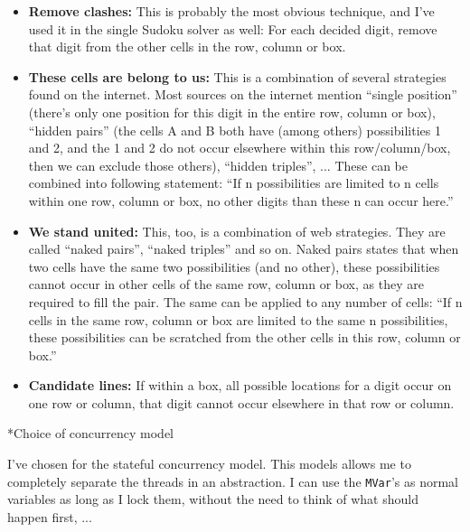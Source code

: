\documentclass[a4paper,12pt]{article}
\begin{document}
\begin{section}
\begin{subsection}
        \begin{itemize}
            \item \textbf{Remove clashes:} This is probably the most obvious
                technique, and I've used it in the single Sudoku solver as well:
                For each decided digit, remove that digit from the other cells
                in the row, column or box.
            \item \textbf{These cells are belong to us:} This is a combination
                of several strategies found on the internet. Most sources on the
                internet mention ``single position'' (there's only one position
                for this digit in the entire row, column or box), ``hidden
                pairs'' (the cells A and B both have (among others)
                possibilities 1 and 2, and the 1 and 2 do not occur elsewhere
                within this row/column/box, then we can exclude those others),
                ``hidden triples'', ... These can be combined into following
                statement: ``If n possibilities are limited to n cells within
                one row, column or box, no other digits than these n can occur
                here.''
            \item \textbf{We stand united:} This, too, is a combination of web
                strategies. They are called ``naked pairs'', ``naked triples''
                and so on. Naked pairs states that when two cells have the same
                two possibilities (and no other), these possibilities cannot
                occur in other cells of the same row, column or box, as they are
                required to fill the pair. The same can be applied to any number
                of cells: ``If n cells in the same row, column or box are
                limited to the same n possibilities, these possibilities can be
                scratched from the other cells in this row, column or box.''
            \item \textbf{Candidate lines:} If within a box, all possible
                locations for a digit occur on one row or column, that digit
                cannot occur elsewhere in that row or column.
        \end{itemize}

    \end{subsection}


    \begin{subsection}*{Choice of concurrency model}

        I've chosen for the stateful concurrency model. This models allows me to
        completely separate the threads in an abstraction. I can use the
        \texttt{MVar}'s as normal variables as long as I lock them, without the
        need to think of what should happen first, ...


\end{subsection}
\end{section}
\end{document}
